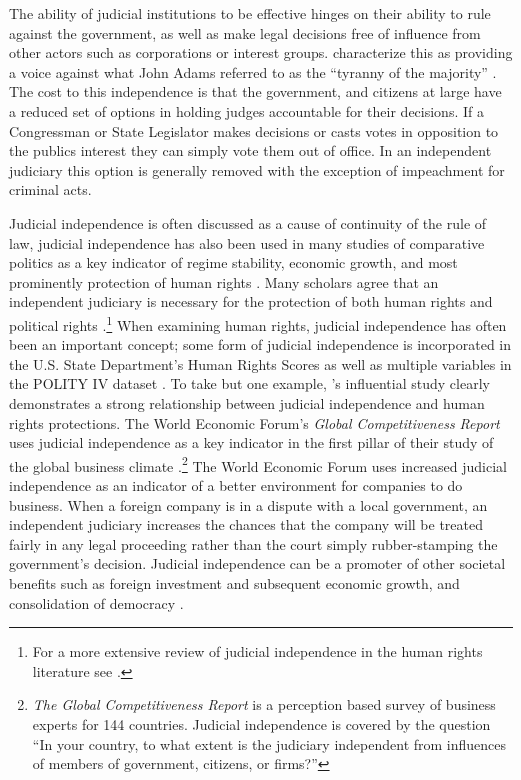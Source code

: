 \documentclass[12pt]{article}
\begin{document}
The ability of judicial institutions to be effective hinges on their ability to rule against the government, as well as make legal decisions free of influence from other actors such as corporations or interest groups.  \citet{Ferejohn2003} characterize this as providing a voice against what John Adams referred to as the ``tyranny of the majority'' \citep{Adams1794}.  The cost to this independence is that the government, and citizens at large have a reduced set of options in holding judges accountable for their decisions.  If a Congressman or State Legislator makes decisions or casts votes in opposition to the publics interest they can simply vote them out of office.  In an independent judiciary this option is generally removed with the exception of impeachment for criminal acts.

Judicial independence is often discussed as a cause of continuity of the rule of law, judicial independence has also been used in many studies of comparative politics as a key indicator of regime stability, economic growth, and most prominently protection of human rights \citep[1]{Linzer2014}.  Many scholars agree that an independent judiciary is necessary for the protection of both human rights and political rights \citep{Keith2002a,Keith2002b,Howard2004,Russell2001}.\footnote{For a more extensive review of judicial independence in the human rights literature see \citep[Footnote 1]{Keith2002b}.}  When examining human rights, judicial independence has often been an important concept; some form of judicial independence is incorporated in the U.S. State Department's Human Rights Scores as well as multiple variables in the POLITY IV dataset \citep{Cingranelli2008, Polity,Howard2004}.  To take but one example, \citet{Keith2002b}'s influential study clearly demonstrates a strong relationship between judicial independence and human rights protections.  The World Economic Forum's \textit{Global Competitiveness Report} uses judicial independence as a key indicator in the first pillar of their study of the global business climate \citep{WEFGLR2014}.\footnote{\textit{The Global Competitiveness Report} is a perception based survey of business experts for 144 countries.  Judicial independence is covered by the question ``In your country, to what extent is the judiciary independent from influences of members of government, citizens, or firms?''}  The World Economic Forum uses increased judicial independence as an indicator of a better environment for companies to do business.  When a foreign company is in a dispute with a local government, an independent judiciary increases the chances that the company will be treated fairly in any legal proceeding rather than the court simply rubber-stamping the government's decision.  Judicial independence can be a promoter of other societal benefits such as foreign investment and subsequent economic growth, and consolidation of democracy \citep[9]{Rios2006}.  
\end{document}
